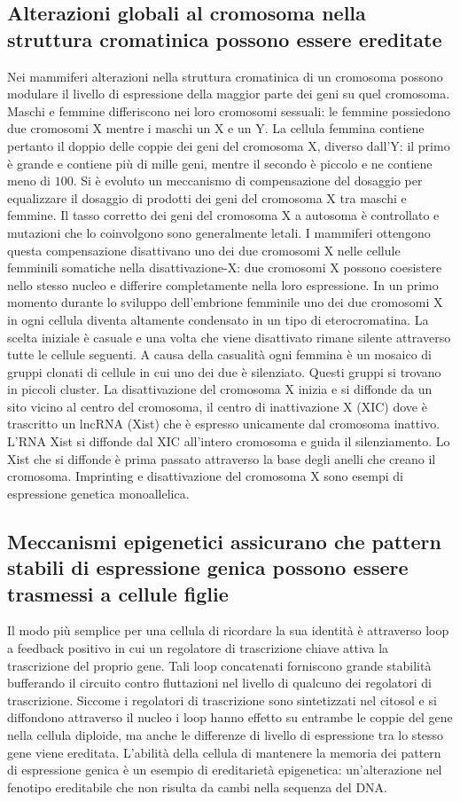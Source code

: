 \subsection{Alterazioni globali al cromosoma nella struttura cromatinica possono essere ereditate}
Nei mammiferi alterazioni nella struttura cromatinica di un cromosoma possono modulare il livello di espressione della maggior parte dei geni su quel cromosoma. Maschi e femmine 
differiscono nei loro cromosomi sessuali: le femmine possiedono due cromosomi X mentre i maschi un X e un Y. La cellula femmina contiene pertanto il doppio delle coppie dei geni del 
cromosoma X, diverso dall'Y: il primo \`e grande e contiene pi\`u di mille geni, mentre il secondo \`e piccolo e ne contiene meno di $100$. Si \`e evoluto un meccanismo di compensazione
del dosaggio per equalizzare il dosaggio di prodotti dei geni del cromosoma X tra maschi e femmine. Il tasso corretto dei geni del cromosoma X a autosoma \`e controllato e mutazioni che
lo coinvolgono sono generalmente letali. I mammiferi ottengono questa compensazione disattivano uno dei due cromosomi X nelle cellule femminili somatiche nella disattivazione-X: due
cromosomi X possono coesistere nello stesso nucleo e differire completamente nella loro espressione. In un primo momento durante lo sviluppo dell'embrione femminile uno dei due 
cromosomi X in ogni cellula diventa altamente condensato in un tipo di eterocromatina. La scelta iniziale \`e casuale e una volta che viene disattivato rimane silente attraverso tutte
le cellule seguenti. A causa della casualit\`a ogni femmina \`e un mosaico di gruppi clonati di cellule in cui uno dei due \`e silenziato. Questi gruppi si trovano in piccoli cluster.
La disattivazione del cromosoma X inizia e si diffonde da un sito vicino al centro del cromosoma, il centro di inattivazione X (XIC) dove \`e trascritto un lncRNA (Xist) che \`e 
espresso unicamente dal cromosoma inattivo. L'RNA Xist si diffonde dal XIC all'intero cromosoma e guida il silenziamento. Lo Xist che si diffonde \`e prima passato attraverso la base 
degli anelli che creano il cromosoma. Imprinting e disattivazione del cromosoma X sono esempi di espressione genetica monoallelica. 
\subsection{Meccanismi epigenetici assicurano che pattern stabili di espressione genica possono essere trasmessi a cellule figlie}
Il modo pi\`u semplice per una cellula di ricordare la sua identit\`a \`e attraverso loop a feedback positivo in cui un regolatore di trascrizione chiave attiva la trascrizione del
proprio gene. Tali loop concatenati forniscono grande stabilit\`a bufferando il circuito contro fluttazioni nel livello di qualcuno dei regolatori di trascrizione. Siccome i regolatori
di trascrizione sono sintetizzati nel citosol e si diffondono attraverso il nucleo i loop hanno effetto su entrambe le coppie del gene nella cellula diploide, ma anche le differenze 
di livello di espressione tra lo stesso gene viene ereditata. L'abilit\`a della cellula di mantenere la memoria dei pattern di espressione genica \`e un esempio di ereditariet\`a
epigenetica: un'alterazione nel fenotipo ereditabile che non risulta da cambi nella sequenza del DNA. 

